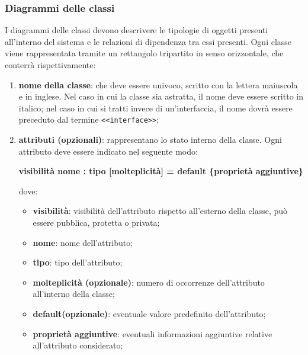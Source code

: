     	\subsubsection*{Diagrammi delle classi}
    	I diagrammi delle classi devono descrivere le tipologie di oggetti presenti all'interno del sistema e le relazioni di dipendenza tra essi presenti. 
    	Ogni classe viene rappresentata tramite un rettangolo tripartito in senso orizzontale, 
    	che conterrà rispettivamente: 
    	\begin{enumerate}
    		\item{\textbf{nome della classe}}: che deve essere univoco, scritto con la lettera maiuscola e in inglese. Nel caso in cui la classe sia astratta, il nome deve essere scritto in italico; nel caso in cui si tratti invece di un'interfaccia, il nome dovrà essere preceduto dal termine \texttt{<<interface>>}; 
    		
    		\item{\textbf{attributi (opzionali)}}: rappresentano lo stato interno della classe. Ogni attributo deve essere indicato nel seguente modo: 
    		\begin{center}
    			\textbf{visibilità nome : tipo [molteplicità] = default \{proprietà aggiuntive\}}
    		\end{center}
    		dove:
    			\begin{itemize}
    				\item{\textbf{visibilità}}: visibilità dell'attributo rispetto all'esterno della classe, può essere pubblica, protetta o privata; 
    				\item{\textbf{nome}}: nome dell'attributo; 
  					\item{\textbf{tipo}}: tipo dell'attributo;
				\item{\textbf{molteplicità (opzionale)}}: numero di occorrenze dell'attributo all'interno della classe;
				\item{\textbf{default(opzionale)}}: eventuale valore predefinito dell'attributo;  
				\item{\textbf{proprietà aggiuntive}}: eventuali informazioni aggiuntive relative all'attributo considerato; 
    			\end{itemize}
    		

\end{enumerate}
